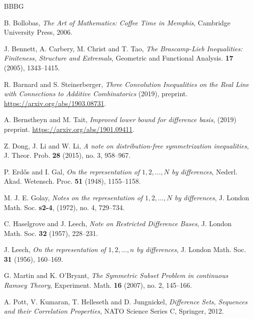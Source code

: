 \documentclass[11pt,reqno]{amsart}
\newcommand{\bburl}[1]{\textcolor{blue}{\url{#1}}}
\numberwithin{equation}{section}
\theoremstyle{plain}
\begin{document}
\vspace{0.5cm}
\begin{thebibliography}{BBBG} %

B. Bollobas, \emph{The Art of Mathematics: Coffee Time in Memphis}, Cambridge University Press, 2006.

 J. Bennett, A. Carbery, M. Christ and T. Tao, \emph{The Brascamp-Lieb Inequalities: Finiteness, Structure and Extremals}, Geometric and Functional Analysis. \textbf{17} (2005), 1343--1415.

R. Barnard and S. Steinerberger, \emph{Three Convolution Inequalities on the Real Line with Connections to Additive Combinatorics} (2019), preprint. \bburl{https://arxiv.org/abs/1903.08731}.

A. Bernstheyn and M. Tait, \emph{Improved lower bound for difference basis}, (2019) preprint. \bburl{https://arxiv.org/abs/1901.09411}.

Z. Dong, J. Li and W. Li, \emph{A note on distribution-free symmetrization inequalities}, J. Theor. Prob. \textbf{28} (2015), no. 3, 958--967.

P. Erd\H{o}s and I. Gal, \emph{On the representation of $1, 2, \dots, N$ by differences}, Nederl. Akad. Wetensch. Proc. \textbf{51} (1948), 1155--1158.

M. J. E. Golay, \emph{Notes on the representation of $1, 2, \dots, N$ by differences}, J. London Math. Soc. \textbf{s2-4}, (1972), no. 4, 729--734.

C. Haselgrove and J. Leech, \emph{Note on Restricted Difference Bases}, J. London Math. Soc. \textbf{32} (1957), 228--231.

J. Leech, \emph{On the representation of $1, 2, \dots, n$ by differences}, J. London Math. Soc. \textbf{31} (1956), 160--169.

G. Martin and K. O'Bryant, \emph{The Symmetric Subset Problem in continuous Ramsey Theory}, Experiment. Math. \textbf{16} (2007), no. 2, 145--166.

A. Pott, V. Kumaran, T. Helleseth and D. Jungnickel, \emph{Difference Sets, Sequences and their Correlation Properties}, NATO Science Series C, Springer, 2012.




\end{thebibliography}

\ \\
\end{document}
